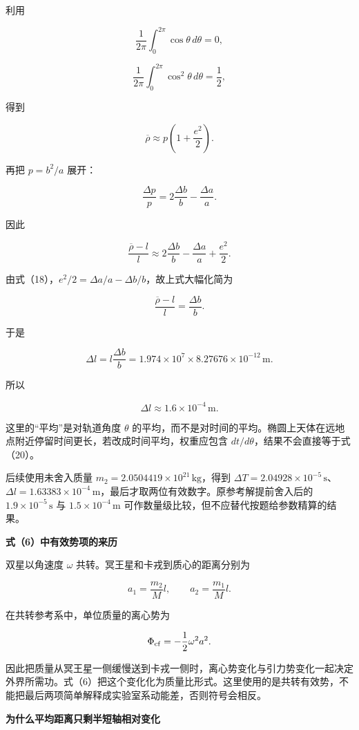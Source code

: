\documentclass[12pt,a4paper,UTF8]{ctexart}
\begin{document}
利用

\[
\frac1{2\pi}\int_0^{2\pi}\cos\theta\,d\theta=0,
\]

\[
\frac1{2\pi}\int_0^{2\pi}\cos^2\theta\,d\theta=\frac12,
\]

得到

\[
\overline\rho\approx p\left(1+\frac{e^2}{2}\right).
\tag{20}
\]

再把 \(p=b^2/a\) 展开：

\[
\frac{\Delta p}{p}
=2\frac{\Delta b}{b}-\frac{\Delta a}{a}.
\]

因此

\[
\frac{\overline\rho-l}{l}
\approx2\frac{\Delta b}{b}-\frac{\Delta a}{a}+\frac{e^2}{2}.
\]

由式（18），\(e^2/2=\Delta a/a-\Delta b/b\)，故上式大幅化简为

\[
\frac{\overline\rho-l}{l}
=\frac{\Delta b}{b}.
\tag{21}
\]

于是

\[
\Delta l=l\frac{\Delta b}{b}
=1.974\times10^7\times8.27676\times10^{-12}\,\mathrm m.
\]

所以

\[
\boxed{\Delta l\approx1.6\times10^{-4}\,\mathrm m}.
\tag{22}
\]

这里的``平均''是对轨道角度 \(\theta\)
的平均，而不是对时间的平均。椭圆上天体在远地点附近停留时间更长，若改成时间平均，权重应包含
\(dt/d\theta\)，结果不会直接等于式（20）。

后续使用未舍入质量 \(m_2=2.0504419\times10^{21}\,\mathrm{kg}\)，得到
\(\Delta T=2.04928\times10^{-5}\,\mathrm s\)、\(\Delta l=1.63383\times10^{-4}\,\mathrm m\)，最后才取两位有效数字。原参考解提前舍入后的
\(1.9\times10^{-5}\,\mathrm s\) 与 \(1.5\times10^{-4}\,\mathrm m\)
可作数量级比较，但不应替代按题给参数精算的结果。

\textbf{式（6）中有效势项的来历}

双星以角速度 \(\omega\) 共转。冥王星和卡戎到质心的距离分别为

\[
a_1=\frac{m_2}{M}l,
\qquad
a_2=\frac{m_1}{M}l.
\]

在共转参考系中，单位质量的离心势为

\[
\Phi_{\rm cf}=-\frac12\omega^2a^2.
\]

因此把质量从冥王星一侧缓慢送到卡戎一侧时，离心势变化与引力势变化一起决定外界所需功。式（6）把这个变化化为质量比形式。这里使用的是共转有效势，不能把最后两项简单解释成实验室系动能差，否则符号会相反。

\textbf{为什么平均距离只剩半短轴相对变化}
\end{document}
